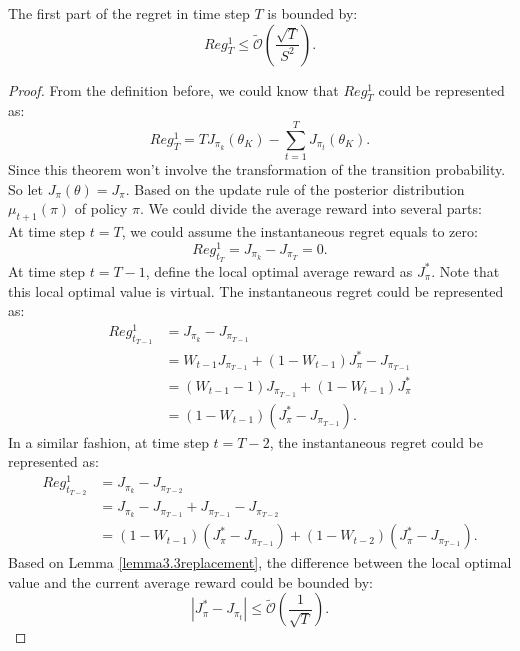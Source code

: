 \begin{theorem}
\label{theorem4appendix}
The first part of the regret in time step $T$ is bounded by:
$$
Reg_{T}^{1} \leq \tilde{\mathcal{O}}(\frac{\sqrt{T}}{S^{2}}).
$$
\begin{proof}
From the definition before, we could know that $Reg_{T}^{1}$ could be represented as:
\begin{equation}
Reg_{T}^{1} = TJ_{\pi_{{k}}}(\theta_{K}) - \sum_{t = 1}^{T}J_{\pi_{t}}(\theta_{K}).
\end{equation}
Since this theorem won't involve the transformation of the transition probability. So let $J_{\pi}(\theta) = J_{\pi}$. Based on the update rule of the posterior distribution $\mu_{t+1}(\pi)$ of policy $\pi$. We could divide the average reward into several parts:\\
At time step $t = T$, we could assume the instantaneous regret equals to zero:
\begin{equation}
Reg_{t_{T}}^{1} = J_{\pi_{ k}}- J_{\pi_{T}} = 0.
\end{equation}
At time step $t = T-1$, define the local optimal average reward as $J_{\pi}^{*}$. Note that this local optimal value is virtual. The instantaneous regret could be represented as:
\begin{equation}
\begin{aligned}
Reg_{t_{T-1}}^{1} &= J_{\pi_{ k}} - J_{\pi_{T-1}}\\
&= W_{t-1}J_{\pi_{T-1}} + (1-W_{t-1})J_{\pi}^{*} - J_{\pi_{T-1}}\\
&= (W_{t-1}-1)J_{\pi_{T-1}} + (1-W_{t-1})J_{\pi}^{*}\\
&= (1-W_{t-1})(J_{\pi}^{*} - J_{\pi_{T-1}}).
\end{aligned}
\end{equation}
In a similar fashion, at time step $t = T-2$, the instantaneous regret could be represented as:
\begin{equation}
\begin{aligned}
Reg_{t_{T-2}}^{1} &= J_{\pi_{ k}} - J_{\pi_{T-2}}\\
&= J_{\pi_{ k}} - J_{\pi_{T-1}} + J_{\pi_{T-1}} - J_{\pi_{T-2}}\\
&= (1-W_{t-1})(J_{\pi}^{*} - J_{\pi_{T-1}}) + (1-W_{t-2})(J_{\pi}^{*} - J_{\pi_{T-1}}).
\end{aligned}
\end{equation}
Based on Lemma \ref{lemma3.3replacement}, the difference between the local optimal value and the current average reward could be bounded by:
\begin{equation}
|J_{\pi}^{*} - J_{\pi_{t}}| \leq \tilde{\mathcal{O}}(\frac{1}{\sqrt{T}}).
\end{equation}


\end{proof}
\end{theorem}
